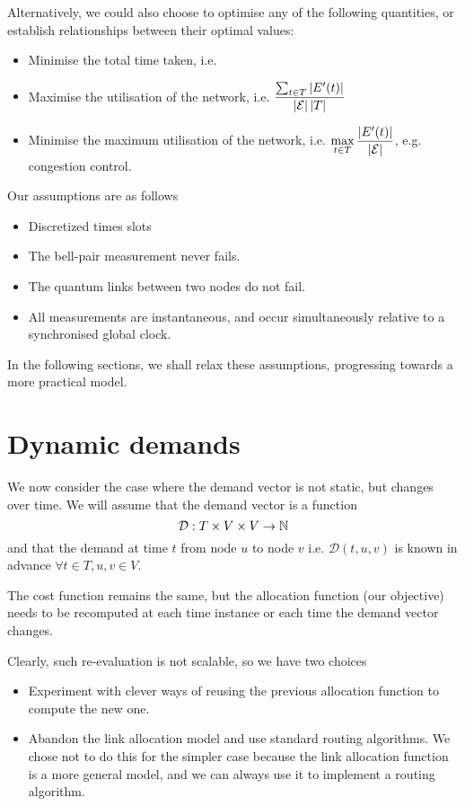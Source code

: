\documentclass{amsart}
\begin{document}
    Alternatively, we could also choose to optimise any of the following quantities, or establish relationships between their optimal values: \begin{itemize}
        \item Minimise the total time taken, i.e. 
        \item Maximise the utilisation of the network, i.e. \(\displaystyle \frac{\sum_{t \in T} \left|E'(t)\right|}{\left|\mathcal{E}\right| \left|T\right|}\)
        \item Minimise the maximum utilisation of the network, i.e. \(\displaystyle \max_{t \in T} \frac{\left|E'(t)\right|}{\left|\mathcal{E}\right|}\), e.g. congestion control.
    \end{itemize}
    Our assumptions are as follows
    \begin{itemize}
        \item Discretized times slots
        \item The bell-pair measurement never fails.
        \item The quantum links between two nodes do not fail.
        \item All measurements are instantaneous, and occur simultaneously relative to a synchronised global clock.
    \end{itemize}

    In the following sections, we shall relax these assumptions, progressing towards a more practical model.

    \section{Dynamic demands}

    We now consider the case where the demand vector is not static, but changes over time. We will assume that the demand vector is a function \[\mathcal{D} : T \times V \times V \rightarrow \mathbb{N}\] and that the demand at time \(t\) from node \(u\) to node \(v\) i.e. \(\mathcal{D}(t, u, v)\) is known in advance \( \forall t \in T, u, v \in V\).

    The cost function remains the same, but the allocation function (our objective) needs to be recomputed at each time instance or each time the demand vector changes.

    Clearly, such re-evaluation is not scalable, so we have two choices \begin{itemize}
        \item Experiment with clever ways of reusing the previous allocation function to compute the new one.
        \item Abandon the link allocation model and use standard routing algorithms. We chose not to do this for the simpler case because the link allocation function is a more general model, and we can always use it to implement a routing algorithm.
    \end{itemize} 
\end{document}
